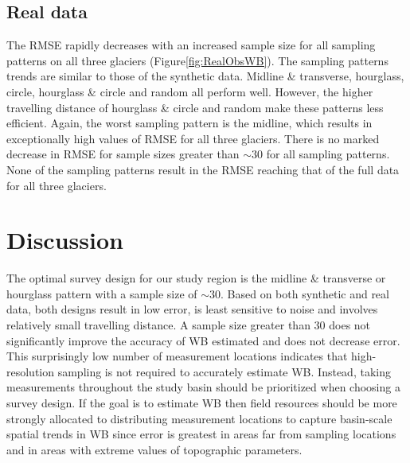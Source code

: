\documentclass{article}
\begin{document}
\subsection{Real data}

The RMSE rapidly decreases with an increased sample size for all sampling patterns on all three glaciers (Figure\ref{fig:RealObsWB}). The sampling patterns trends are similar to those of the synthetic data. Midline \& transverse, hourglass, circle, hourglass \& circle and random all perform well. However, the higher travelling distance of hourglass \& circle and random make these patterns less efficient.  Again, the worst sampling pattern is the midline, which results in exceptionally high values of RMSE for all three glaciers. There is no marked decrease in RMSE for sample sizes greater than $\sim30$ for all sampling patterns. None of the sampling patterns result in the RMSE reaching that of the full data for all three glaciers. 

\section{Discussion}

The optimal survey design for our study region is the midline \& transverse or  hourglass pattern with a sample size of $\sim30$. Based on both synthetic and real data, both designs result in low error, is least sensitive to noise and involves relatively small travelling distance. A sample size greater than 30 does not significantly improve the accuracy of WB estimated and does not decrease error. This surprisingly low number of measurement locations indicates that high-resolution sampling is not required to accurately estimate WB. Instead, taking measurements throughout the study basin should be prioritized when choosing a survey design. If the goal is to estimate WB then field resources should be more strongly allocated to distributing measurement locations to capture basin-scale spatial trends in WB since error is greatest in areas far from sampling locations and in areas with extreme values of topographic parameters. 
\end{document}
